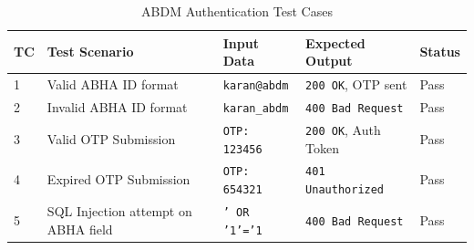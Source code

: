 \begin{table}[h!]
    \centering
    \begin{tabular}{|p{0.5cm}|p{3.5cm}|p{3cm}|p{3cm}|p{2cm}|}
        \hline
        \textbf{TC} & \textbf{Test Scenario} & \textbf{Input Data} & \textbf{Expected Output} & \textbf{Status} \\
        \hline
        1 & Valid ABHA ID format & \texttt{karan@abdm} & \texttt{200 OK}, OTP sent & Pass \\
        \hline
        2 & Invalid ABHA ID format & \texttt{karan\_abdm} & \texttt{400 Bad Request} & Pass \\
        \hline
        3 & Valid OTP Submission & \texttt{OTP: 123456} & \texttt{200 OK}, Auth Token & Pass \\
        \hline
        4 & Expired OTP Submission & \texttt{OTP: 654321} & \texttt{401 Unauthorized} & Pass \\
        \hline
        5 & SQL Injection attempt on ABHA field & \texttt{' OR '1'='1} & \texttt{400 Bad Request} & Pass \\
        \hline
    \end{tabular}
    \caption{ABDM Authentication Test Cases}
    \label{tab:app_test_cases}
\end{table}
